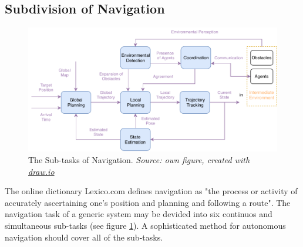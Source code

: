 \subsection{Subdivision of Navigation}

\begin{figure}
  \centering
  \includegraphics[width=\textwidth]{Figures/draw.io/sub-tasks_of_navigation}
  \decoRule
  \caption[The Sub-tasks of Navigation]{The Sub-tasks of Navigation. \textit{Source: own figure, created with \href{https://www.draw.io/}{draw.io}}}
  \label{fig:sub-tasks_of_navigation}
\end{figure}

The online dictionary Lexico.com \cite{Lexico.com-navigation} defines navigation as 
"the process or activity of accurately ascertaining one's position and planning and following a route".
The navigation task of a generic system may be devided into six continuos and simultaneous sub-tasks (see figure \ref{fig:sub-tasks_of_navigation}).
A sophisticated method for autonomous navigation should cover all of the sub-tasks.

